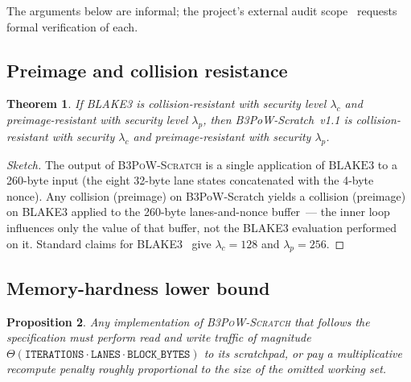 \documentclass[11pt,a4paper]{article}
\theoremstyle{plain}
\newtheorem{theorem}{Theorem}[section]
\newtheorem{proposition}[theorem]{Proposition}
\theoremstyle{definition}
\theoremstyle{remark}
\begin{document}
The arguments below are informal; the project's external audit
scope~\cite{b3chain-auditscope} requests formal verification of each.

\subsection{Preimage and collision resistance}\label{sec:security-pc}

\begin{theorem}\label{thm:inherited}
If BLAKE3 is collision-resistant with security level $\lambda_c$ and
preimage-resistant with security level $\lambda_p$, then
B3PoW-Scratch~v1.1 is collision-resistant with security $\lambda_c$
and preimage-resistant with security $\lambda_p$.
\end{theorem}

\begin{proof}[Sketch]
The output of \textsc{B3PoW-Scratch} is a single application of
$\mathrm{BLAKE3}$ to a 260-byte input (the eight 32-byte lane states
concatenated with the 4-byte nonce). Any collision (preimage) on
B3PoW-Scratch yields a collision (preimage) on BLAKE3 applied to the
260-byte lanes-and-nonce buffer~--- the inner loop influences only
the value of that buffer, not the BLAKE3 evaluation performed on
it. Standard claims for BLAKE3~\cite{oconnor2020blake3} give
$\lambda_c = 128$ and $\lambda_p = 256$.
\end{proof}

\subsection{Memory-hardness lower bound}\label{sec:security-mh}

\begin{proposition}\label{prop:mh}
Any implementation of \textsc{B3PoW-Scratch} that follows the
specification must perform read and write traffic of magnitude
$\Theta(\texttt{ITERATIONS}\cdot\texttt{LANES}\cdot
\texttt{BLOCK\_BYTES})$ to its scratchpad, or pay a multiplicative
recompute penalty roughly proportional to the size of the omitted
working set.
\end{proposition}
\end{document}
